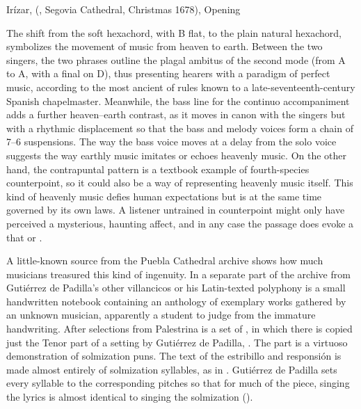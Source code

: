{Irízar,  (, Segovia Cathedral,
Christmas 1678), Opening}

The shift from the  soft hexachord, with B flat, to the plain
natural hexachord, symbolizes the movement of music from heaven to earth.
Between the two singers, the two phrases outline the plagal ambitus of the
second mode (from A to A, with a final on D), thus presenting hearers with a
paradigm of perfect music, according to the most ancient of rules known to a
late-seventeenth-century Spanish chapelmaster.
Meanwhile, the bass line for the continuo accompaniment adds a further
heaven--earth contrast, as it moves in canon with the singers but with a
rhythmic displacement so that the bass and melody voices form a chain of 7--6
suspensions.
The way the bass voice moves at a delay from the solo voice suggests the way
earthly music imitates or echoes heavenly music.
On the other hand, the contrapuntal pattern is a textbook example of
fourth-species counterpoint, so it could also be a way of representing heavenly
music itself.  
This kind of heavenly music defies human expectations but is at the same time
governed by its own laws.
A listener untrained in counterpoint might only have perceived a mysterious,
haunting affect, and in any case the passage does evoke a  that  or .

A little-known source from the Puebla Cathedral archive shows how much
musicians treasured this kind of ingenuity.
In a separate part of the archive from Gutiérrez de Padilla's other villancicos
or his Latin-texted polyphony is a small handwritten notebook containing an
anthology of exemplary works gathered by an unknown musician, apparently a
student to judge from the immature handwriting.
After selections from Palestrina is a set of , in which there is copied just the Tenor part of a setting by
Gutiérrez de Padilla, .
The part is a virtuoso demonstration of solmization puns.
The text of the estribillo and responsión is made almost entirely of
solmization syllables, as in .
Gutiérrez de Padilla sets every syllable to the corresponding pitches so that
for much of the piece, singing the lyrics is almost identical to singing the
solmization ().

